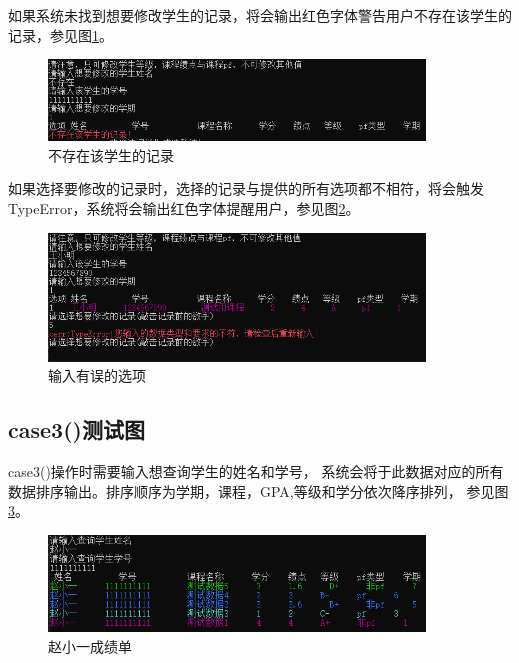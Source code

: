 \documentclass[fontset=windows]{article}
\begin{document}
如果系统未找到想要修改学生的记录，将会输出红色字体警告用户不存在该学生的记录，参见图\ref{ref9}。
\newpage
\begin{figure}[h!]
	\begin{center}
		\vspace{-0.3cm}
		\includegraphics[width = 10cm]{case2 不存在该学生的记录.png}
		\caption{不存在该学生的记录}
		\label{ref9}
	\end{center}
\end{figure}

如果选择要修改的记录时，选择的记录与提供的所有选项都不相符，将会触发TypeError，系统将会输出红色字体提醒用户，参见图\ref{ref10}。

\begin{figure}[h!]
	\begin{center}
		\includegraphics[width = 10cm]{case2 输入类型错误.png}
		\caption{输入有误的选项}
		\label{ref10}
	\end{center}
\end{figure}

\subsection{case3()测试图}
case3()操作时需要输入想查询学生的姓名和学号， 系统会将于此数据对应的所有数据排序输出。排序顺序为学期，课程，GPA,等级和学分依次降序排列，
参见图\ref{ref11}。

\begin{figure}[h!]
	\begin{center}
		\includegraphics[width = 10cm]{case3 赵小一.png}
		\caption{赵小一成绩单}
		\label{ref11}
	\end{center}
\end{figure}
\end{document}
